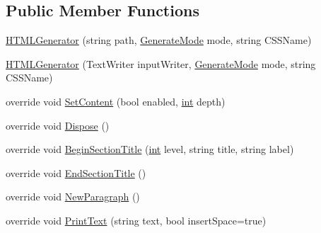 \subsection*{Public Member Functions}
\begin{DoxyCompactItemize}
\item 
\hyperlink{class_software_engineering_tools_1_1_documentation_1_1_h_t_m_l_generator_abf005611d22fef04264c8d843ceee533}{H\+T\+M\+L\+Generator} (string path, \hyperlink{class_software_engineering_tools_1_1_documentation_1_1_h_t_m_l_generator_a86814d784071578546b204de6e0bbf11}{Generate\+Mode} mode, string C\+S\+S\+Name)
\item 
\hyperlink{class_software_engineering_tools_1_1_documentation_1_1_h_t_m_l_generator_a1000929b230ac94f5ee47e8695c9ec0c}{H\+T\+M\+L\+Generator} (Text\+Writer input\+Writer, \hyperlink{class_software_engineering_tools_1_1_documentation_1_1_h_t_m_l_generator_a86814d784071578546b204de6e0bbf11}{Generate\+Mode} mode, string C\+S\+S\+Name)
\item 
override void \hyperlink{class_software_engineering_tools_1_1_documentation_1_1_h_t_m_l_generator_a18122215120a5a52844cac3b3b31059f}{Set\+Content} (bool enabled, \hyperlink{namespace_software_engineering_tools_1_1_documentation_a4a8017aa254d1d05b03db5132b7dd3a7afa7153f7ed1cb6c0fcf2ffb2fac21748}{int} depth)
\item 
override void \hyperlink{class_software_engineering_tools_1_1_documentation_1_1_h_t_m_l_generator_adfcd6c7e94631406dc3ce075c62317ef}{Dispose} ()
\item 
override void \hyperlink{class_software_engineering_tools_1_1_documentation_1_1_h_t_m_l_generator_a22166b2d3e73aba20bdc9a5d49c0a1e0}{Begin\+Section\+Title} (\hyperlink{namespace_software_engineering_tools_1_1_documentation_a4a8017aa254d1d05b03db5132b7dd3a7afa7153f7ed1cb6c0fcf2ffb2fac21748}{int} level, string title, string label)
\item 
override void \hyperlink{class_software_engineering_tools_1_1_documentation_1_1_h_t_m_l_generator_a1a32fa3632df947d926d49917248223a}{End\+Section\+Title} ()
\item 
override void \hyperlink{class_software_engineering_tools_1_1_documentation_1_1_h_t_m_l_generator_a18ea20897007ab1c778b5dcf21c650ae}{New\+Paragraph} ()
\item 
override void \hyperlink{class_software_engineering_tools_1_1_documentation_1_1_h_t_m_l_generator_a1eea3c55ddc1824e807b35b6e650db4b}{Print\+Text} (string text, bool insert\+Space=true)
\item 

\end{DoxyCompactItemize}
